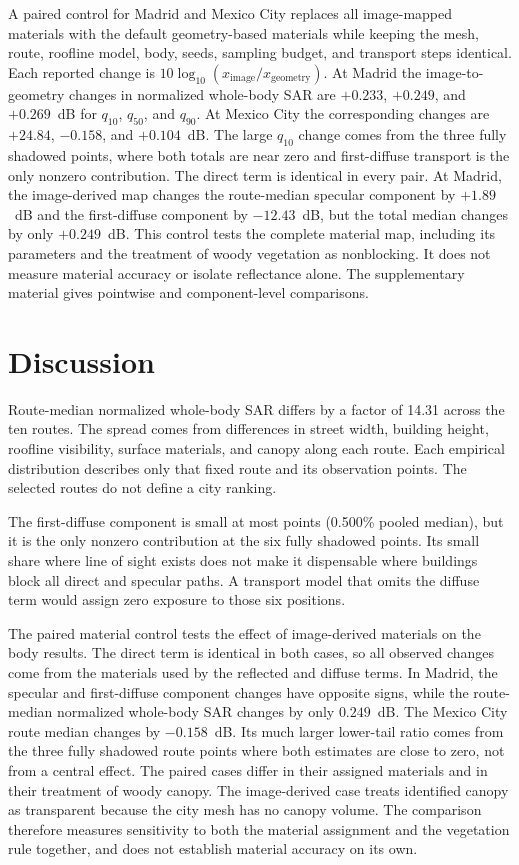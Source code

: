 \documentclass{ieeeaccess}
\begin{document}
A paired control for Madrid and Mexico City replaces all image-mapped materials
with the default geometry-based materials while keeping the mesh, route,
roofline model, body, seeds, sampling budget, and transport steps identical.
Each reported change is
$10\log_{10}(x_{\mathrm{image}}/x_{\mathrm{geometry}})$. At Madrid the
image-to-geometry changes in normalized whole-body SAR are $+0.233$, $+0.249$,
and $+0.269$~dB for $q_{10}$, $q_{50}$, and $q_{90}$. At Mexico City the
corresponding changes are $+24.84$, $-0.158$, and $+0.104$~dB. The large
$q_{10}$ change comes from the three fully shadowed points, where both totals
are near zero and first-diffuse transport is the only nonzero contribution. The
direct term is identical in every pair. At Madrid, the image-derived map changes
the route-median specular component by $+1.89$~dB and the first-diffuse
component by $-12.43$~dB, but the total median changes by only $+0.249$~dB.
This control tests the complete material map, including its parameters and the
treatment of woody vegetation as nonblocking. It does not measure material
accuracy or isolate reflectance alone. The supplementary material gives
pointwise and component-level comparisons.

\section{Discussion}
\label{sec:discussion}

Route-median normalized whole-body SAR differs by a factor of 14.31 across the
ten routes. The spread comes from differences in street width, building height,
roofline visibility, surface materials, and canopy along each route. Each
empirical distribution describes only that fixed route and its observation
points. The selected routes do not define a city ranking.

The first-diffuse component is small at most points (0.500\% pooled median),
but it is the only nonzero contribution at the six fully shadowed points. Its
small share where line of sight exists does not make it dispensable where
buildings block all direct and specular paths. A transport model that omits the
diffuse term would assign zero exposure to those six positions.

The paired material control tests the effect of image-derived materials on the
body results. The direct term is identical in both cases, so all observed
changes come from the materials used by the reflected and diffuse terms. In
Madrid, the specular and first-diffuse component changes have opposite signs,
while the route-median normalized whole-body SAR changes by only $0.249$~dB.
The Mexico City route median changes by $-0.158$~dB. Its much larger lower-tail
ratio comes from the three fully shadowed route points where both estimates are
close to zero, not from a central effect. The paired cases differ in their
assigned materials and in their treatment of woody canopy. The image-derived
case treats identified canopy as transparent because the city mesh has no canopy
volume. The comparison therefore measures sensitivity to both the material
assignment and the vegetation rule together, and does not establish material
accuracy on its own.
\end{document}
